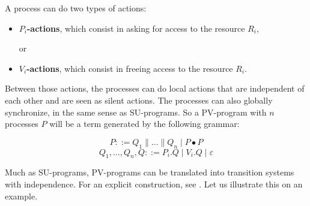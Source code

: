 A process can do two types of actions:
\begin{itemize}
	\item \textbf{$P_i$-actions}, which consist in asking for access to the resource $R_i$,
	\vspace{-0.4cm} \item[or] ~
	\vspace{-0.4cm} \item \textbf{$V_i$-actions}, which consist in freeing access to the resource $R_i$.
\end{itemize}

Between those actions, the processes can do local actions that are independent of each other and are seen as silent actions. The processes can also globally synchronize, in the same sense as SU-programs. So a PV-program with $n$ processes $P$ will be a term generated by the following grammar:

$$P ::= Q_1\parallel \ldots \parallel Q_n \mid P\bullet P$$
$$Q_1, \ldots, Q_n, Q ::= P_i.Q \mid V_i.Q \mid \varepsilon$$

Much as SU-programs, PV-programs can be translated into transition systems with independence. For an explicit construction, see \cite{fajstrup16}. Let us illustrate this on an example.

